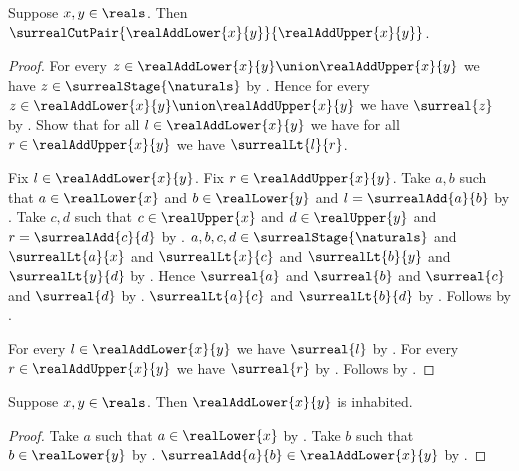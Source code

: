 \begin{proposition}\label{surreal_real_add_cut_pair}
    Suppose $x,y\in\reals$.
    Then $\surrealCutPair{\realAddLower{x}{y}}
        {\realAddUpper{x}{y}}$.
\end{proposition}
\begin{proof}
    For every $z\in\realAddLower{x}{y}\union
        \realAddUpper{x}{y}$ we have
        $z\in\surrealStage{\naturals}$
        by
        .
    Hence for every $z\in\realAddLower{x}{y}\union
        \realAddUpper{x}{y}$ we have $\surreal{z}$
        by
        .
    Show that for all $l\in\realAddLower{x}{y}$ we have for all
        $r\in\realAddUpper{x}{y}$ we have $\surrealLt{l}{r}$.
    \begin{subproof}
        Fix $l\in\realAddLower{x}{y}$.
        Fix $r\in\realAddUpper{x}{y}$.
        Take $a,b$ such that
            $a\in\realLower{x}$ and $b\in\realLower{y}$ and
            $l=\surrealAdd{a}{b}$
            by .
        Take $c,d$ such that
            $c\in\realUpper{x}$ and $d\in\realUpper{y}$ and
            $r=\surrealAdd{c}{d}$
            by .
        $a,b,c,d\in\surrealStage{\naturals}$ and
            $\surrealLt{a}{x}$ and $\surrealLt{x}{c}$ and
            $\surrealLt{b}{y}$ and $\surrealLt{y}{d}$
            by
            .
        Hence $\surreal{a}$ and $\surreal{b}$ and
            $\surreal{c}$ and $\surreal{d}$
            by
            .
        $\surrealLt{a}{c}$ and $\surrealLt{b}{d}$
            by
            .
        Follows by .
    \end{subproof}
    For every $l\in\realAddLower{x}{y}$ we have $\surreal{l}$
        by .
    For every $r\in\realAddUpper{x}{y}$ we have $\surreal{r}$
        by .
    Follows by .
\end{proof}

\begin{proposition}\label{surreal_real_add_lower_inhabited}
    Suppose $x,y\in\reals$.
    Then $\realAddLower{x}{y}$ is inhabited.
\end{proposition}
\begin{proof}
    Take $a$ such that $a\in\realLower{x}$
        by .
    Take $b$ such that $b\in\realLower{y}$
        by .
    $\surrealAdd{a}{b}\in\realAddLower{x}{y}$
        by .
\end{proof}

